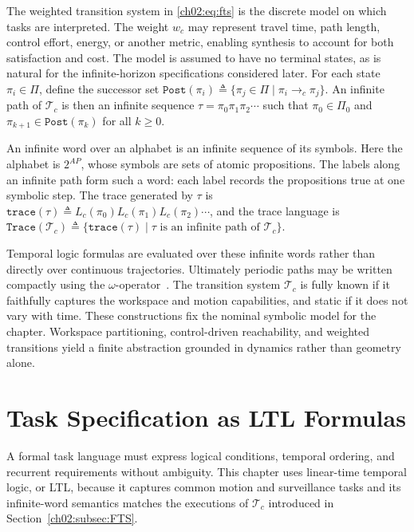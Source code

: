 The weighted transition system in \eqref{ch02:eq:fts} is the discrete model on
which tasks are interpreted. The weight $w_c$ may represent travel time, path
length, control effort, energy, or another metric, enabling synthesis to account
for both satisfaction and cost. The model is assumed to have no terminal states,
as is natural for the infinite-horizon specifications considered later. For each
state
$\pi_i \in \Pi$, define the successor set
$\texttt{Post}(\pi_i) \triangleq
\{\pi_j \in \Pi \mid \pi_i \longrightarrow_c \pi_j\}$.
An infinite path of $\mathcal{T}_c$ is then an infinite sequence
$\tau = \pi_0\pi_1\pi_2\cdots$
such that
$\pi_0 \in \Pi_0$
and
$\pi_{k+1} \in \texttt{Post}(\pi_k)$
for all $k \geq 0$.
\begin{revision}
An infinite word over an alphabet is an infinite sequence of its symbols.
Here the alphabet is $2^{AP}$, whose symbols are sets of atomic propositions.
The labels along an infinite path form such a word: each label records
the propositions true at one symbolic step.
The trace generated by $\tau$ is
$\texttt{trace}(\tau) \triangleq
L_c(\pi_0)L_c(\pi_1)L_c(\pi_2)\cdots$, and the trace language is
$\texttt{Trace}(\mathcal{T}_c) \triangleq
\{\texttt{trace}(\tau) \mid
\tau \text{ is an infinite path of } \mathcal{T}_c\}$.
\end{revision}
Temporal logic formulas are evaluated over these infinite words rather than
directly over continuous trajectories. Ultimately periodic paths may be written
compactly using the $\omega$-operator~\citep{baier2008principles}. The
transition system $\mathcal{T}_c$ is fully known if it faithfully captures the
workspace and motion capabilities, and static if it does not vary with time.
These constructions fix the nominal symbolic model for the chapter. Workspace
partitioning, control-driven reachability, and weighted transitions yield a
finite abstraction grounded in dynamics rather than geometry alone.


\section{Task Specification as LTL Formulas}
\label{ch02:sec:LTL}

A formal task language must express logical conditions, temporal ordering, and
recurrent requirements without ambiguity. This chapter uses linear-time
temporal logic, or LTL, because it captures common motion and surveillance
tasks and its infinite-word semantics matches the executions of
$\mathcal{T}_c$ introduced in Section~\ref{ch02:subsec:FTS}.

